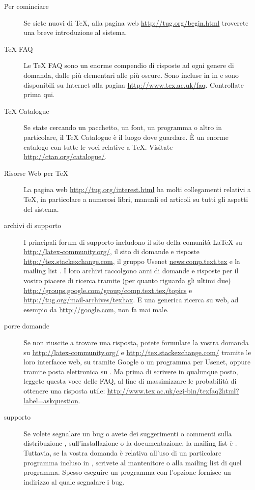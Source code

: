 \documentclass{article}
\begin{document}
\begin{description}
\item [Per cominciare] Se siete nuovi di \TeX, alla pagina web
  \url{http://tug.org/begin.html} troverete una breve introduzione al sistema.

\item [\TeX{} FAQ] Le \TeX{} FAQ sono un enorme compendio di
  risposte ad ogni genere di domanda, dalle più elementari alle più
  oscure. Sono incluse in \TL{} in
   e sono disponibili
  su Internet alla pagina \url{http://www.tex.ac.uk/faq}. Controllate
  prima qui.

\item [\TeX{} Catalogue] Se state cercando un pacchetto, un font, un
  programma o altro in particolare, il \TeX{} Catalogue è il luogo dove
  guardare. È un enorme catalogo con tutte le voci relative a \TeX. Visitate
  \url{http://ctan.org/catalogue/}.

\item [Risorse Web per \TeX{}] La pagina web
  \url{http://tug.org/interest.html} ha molti collegamenti relativi a
  \TeX, in particolare a numerosi libri, manuali ed articoli su tutti
  gli aspetti del sistema.

\item [archivi di supporto] I principali forum di supporto includono
  il sito della comunità \LaTeX{} su \url{http://latex-community.org/},
  il sito di domande e risposte \url{http://tex.stackexchange.com}, il
  gruppo Usenet \url{news:comp.text.tex} e la mailing list
  . I loro archivi raccolgono anni di domande e risposte
  per il vostro piacere di ricerca tramite (per quanto riguarda gli ultimi due)
  \url{http://groups.google.com/group/comp.text.tex/topics} e
  \url{http://tug.org/mail-archives/texhax}. E una
  generica ricerca su web, ad esempio da \url{http://google.com}, non fa
  mai male.

\item [porre domande] Se non riuscite a trovare una risposta, potete
  formulare la vostra domanda su
  \url{http://latex-community.org/} e \url{http://tex.stackexchange.com/}
  tramite le loro interfacce web, su  tramite Google o
  un programma per Usenet, oppure tramite posta elettronica su
  . Ma prima di scrivere in qualunque posto, leggete
  questa voce delle FAQ, al fine di massimizzare le probabilità di ottenere una
  risposta utile:
  \url{http://www.tex.ac.uk/cgi-bin/texfaq2html?label=askquestion}.

\item [supporto \TL{}] Se volete segnalare un bug o avete dei suggerimenti o
  commenti sulla distribuzione \TL{}, sull'installazione o la
  documentazione, la mailing list è . Tuttavia, se
  la vostra domanda è relativa all'uso di un particolare programma incluso in
  \TL{}, scrivete al mantenitore o alla mailing list di quel programma.
  Spesso eseguire un programma con l'opzione  fornisce un
  indirizzo al quale segnalare i bug.

\end{description}
\end{document}
